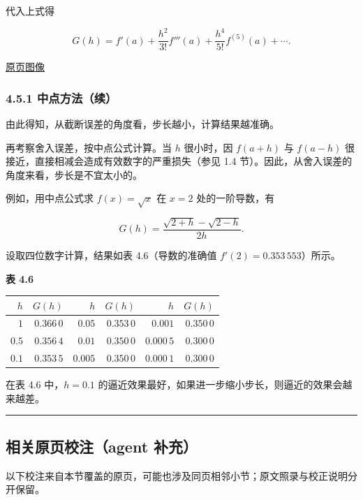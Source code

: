 \documentclass[
  10pt,
  fontset=fandol]{ctexart}
\newcounter{none} %
\begin{document}
代入上式得

\[
G(h)=f'(a)+\frac{h^2}{3!}f'''(a)+\frac{h^4}{5!}f^{(5)}(a)+\cdots.
\]

\href{../../source-images/pdf-113.jpeg}{原页图像}

\subsubsection{4.5.1 中点方法（续）}\label{ux4e2dux70b9ux65b9ux6cd5ux7eed}

由此得知，从截断误差的角度看，步长越小，计算结果越准确。

再考察舍入误差，按中点公式计算。当 \(h\) 很小时，因 \(f(a+h)\) 与 \(f(a-h)\) 很接近，直接相减会造成有效数字的严重损失（参见 1.4 节）。因此，从舍入误差的角度来看，步长是不宜太小的。

例如，用中点公式求 \(f(x)=\sqrt{x}\) 在 \(x=2\) 处的一阶导数，有

\[
G(h)=\frac{\sqrt{2+h}-\sqrt{2-h}}{2h}.
\]

设取四位数字计算，结果如表 4.6（导数的准确值 \(f'(2)=0.353\,553\)）所示。

\textbf{表 4.6}

{\def\LTcaptype{none} %
\begin{longtable}[]{@{}rrrrrr@{}}
\toprule\noalign{}
\(h\) & \(G(h)\) & \(h\) & \(G(h)\) & \(h\) & \(G(h)\) \\
\midrule\noalign{}
\endhead
\bottomrule\noalign{}
\endlastfoot
\(1\) & \(0.366\,0\) & \(0.05\) & \(0.353\,0\) & \(0.001\) & \(0.350\,0\) \\
\(0.5\) & \(0.356\,4\) & \(0.01\) & \(0.350\,0\) & \(0.000\,5\) & \(0.300\,0\) \\
\(0.1\) & \(0.353\,5\) & \(0.005\) & \(0.350\,0\) & \(0.000\,1\) & \(0.300\,0\) \\
\end{longtable}
}

在表 4.6 中，\(h=0.1\) 的逼近效果最好，如果进一步缩小步长，则逼近的效果会越来越差。

\begin{center}\rule{0.5\linewidth}{0.5pt}\end{center}

\subsection{相关原页校注（agent 补充）}\label{ux76f8ux5173ux539fux9875ux6821ux6ce8agent-ux8865ux5145}

以下校注来自本节覆盖的原页，可能也涉及同页相邻小节；原文照录与校正说明分开保留。
\end{document}

